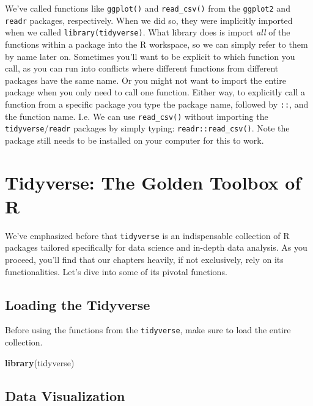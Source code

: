 \documentclass[
]{book}
\newenvironment{Shaded}{\begin{snugshade}}{\end{snugshade}}
\newcommand{\FunctionTok}[1]{\textcolor[rgb]{0.13,0.29,0.53}{\textbf{#1}}}
\newcommand{\NormalTok}[1]{#1}
\begin{document}
We've called functions like \texttt{ggplot()} and \texttt{read\_csv()} from the \texttt{ggplot2} and \texttt{readr} packages, respectively. When we did so, they were implicitly imported when we called \texttt{library(tidyverse)}. What library does is import \emph{all} of the functions within a package into the R workspace, so we can simply refer to them by name later on. Sometimes you'll want to be explicit to which function you call, as you can run into conflicts where different functions from different packages have the same name. Or you might not want to import the entire package when you only need to call one function. Either way, to explicitly call a function from a specific package you type the package name, followed by \texttt{::}, and the function name. I.e. We can use \texttt{read\_csv()} without importing the \texttt{tidyverse}/\texttt{readr} packages by simply typing: \texttt{readr::read\_csv()}. Note the package still needs to be installed on your computer for this to work.

\hypertarget{tidyverse-the-golden-toolbox-of-r}{%
\section{Tidyverse: The Golden Toolbox of R}\label{tidyverse-the-golden-toolbox-of-r}}

We've emphasized before that \texttt{tidyverse} is an indispensable collection of R packages tailored specifically for data science and in-depth data analysis. As you proceed, you'll find that our chapters heavily, if not exclusively, rely on its functionalities. Let's dive into some of its pivotal functions.

\hypertarget{loading-the-tidyverse}{%
\subsection{Loading the Tidyverse}\label{loading-the-tidyverse}}

Before using the functions from the \texttt{tidyverse}, make sure to load the entire collection.

\begin{Shaded}
\begin{Highlighting}[]
\FunctionTok{library}\NormalTok{(tidyverse)}
\end{Highlighting}
\end{Shaded}

\hypertarget{data-visualization}{%
\subsection{Data Visualization}\label{data-visualization}}
\end{document}
